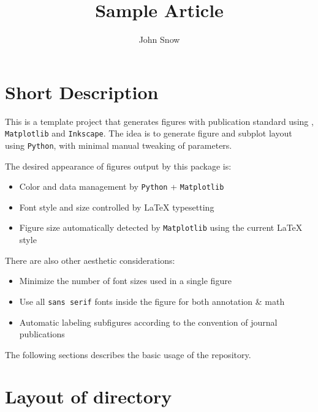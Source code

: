 




\title{Sample Article}
\author{John Snow}
\newcommand*{\mpl}{\texttt{Matplotlib}\xspace}
\newcommand*{\ink}{\texttt{Inkscape}\xspace}
\newcommand*{\py}{\texttt{Python}\xspace}


\maketitle

\doublespacing


\section{Short Description}
\label{sec:usage}

This is a template project that generates figures with publication
standard using \LaTeXe{}, \mpl and \ink. The idea is to generate
figure and subplot layout using \py, with minimal manual tweaking of
parameters.

The desired appearance of figures output by this package is:
\begin{itemize}
\item Color and data management by \py{} + \mpl{}
\item Font style and size controlled by \LaTeX{} typesetting
\item Figure size automatically detected by \mpl{} using the current \LaTeX{} style
\end{itemize}

There are also other aesthetic considerations:
\begin{itemize}
\item Minimize the number of font sizes used in a single figure
\item Use all \texttt{sans serif} fonts inside the figure for both annotation \& math
\item Automatic labeling subfigures according to the convention of journal publications
\end{itemize}

The following sections describes the basic usage of the repository. 

\section{Layout of directory}
\label{sec:layout-directory}


